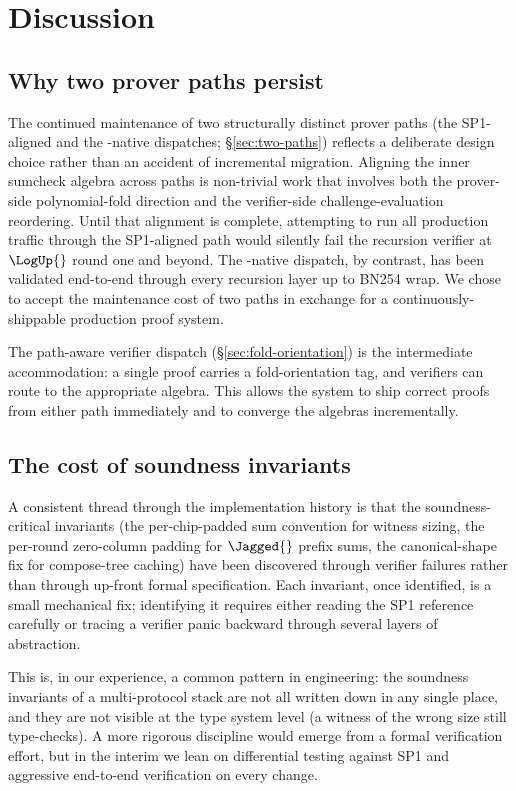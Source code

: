 \section{Discussion}
\label{sec:discussion}

\subsection{Why two prover paths persist}

The continued maintenance of two structurally distinct prover paths (the SP1-aligned and the \Ziren{}-native dispatches; \S\ref{sec:two-paths}) reflects a deliberate design choice rather than an accident of incremental migration. Aligning the inner sumcheck algebra across paths is non-trivial work that involves both the prover-side polynomial-fold direction and the verifier-side challenge-evaluation reordering. Until that alignment is complete, attempting to run all production traffic through the SP1-aligned path would silently fail the recursion verifier at $\LogUp{}$ round one and beyond. The \Ziren{}-native dispatch, by contrast, has been validated end-to-end through every recursion layer up to BN254 wrap. We chose to accept the maintenance cost of two paths in exchange for a continuously-shippable production proof system.

The path-aware verifier dispatch (\S\ref{sec:fold-orientation}) is the intermediate accommodation: a single proof carries a fold-orientation tag, and verifiers can route to the appropriate algebra. This allows the system to ship correct proofs from either path immediately and to converge the algebras incrementally.

\subsection{The cost of soundness invariants}

A consistent thread through the implementation history is that the soundness-critical invariants (the per-chip-padded sum convention for witness sizing, the per-round zero-column padding for $\Jagged{}$ prefix sums, the canonical-shape fix for compose-tree caching) have been discovered through verifier failures rather than through up-front formal specification. Each invariant, once identified, is a small mechanical fix; identifying it requires either reading the SP1 reference carefully or tracing a verifier panic backward through several layers of abstraction.

This is, in our experience, a common pattern in \zkVM{} engineering: the soundness invariants of a multi-protocol stack are not all written down in any single place, and they are not visible at the type system level (a witness of the wrong size still type-checks). A more rigorous discipline would emerge from a formal verification effort, but in the interim we lean on differential testing against SP1 and aggressive end-to-end verification on every change.

